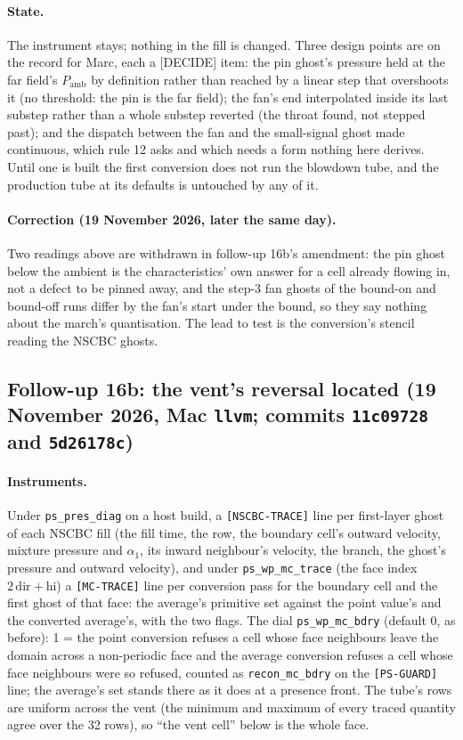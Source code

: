 \documentclass[11pt,a4paper]{article}
\newcommand{\code}[1]{\texttt{\small #1}}
\begin{document}
\paragraph{State.}  The instrument stays; nothing in the fill is
changed.  Three design points are on the record for Marc, each a
[DECIDE] item: the pin ghost's pressure held at the far field's
$P_{\mathrm{amb}}$ by definition rather than reached by a linear step
that overshoots it (no threshold: the pin is the far field); the fan's
end interpolated inside its last substep rather than a whole substep
reverted (the throat found, not stepped past); and the dispatch between
the fan and the small-signal ghost made continuous, which rule 12 asks
and which needs a form nothing here derives.  Until one is built the
first conversion does not run the blowdown tube, and the production
tube at its defaults is untouched by any of it.

\paragraph{Correction (19 November 2026, later the same day).}  Two
readings above are withdrawn in follow-up 16b's amendment: the pin
ghost below the ambient is the characteristics' own answer for a cell
already flowing in, not a defect to be pinned away, and the step-3 fan
ghosts of the bound-on and bound-off runs differ by the fan's start
under the bound, so they say nothing about the march's quantisation.
The lead to test is the conversion's stencil reading the NSCBC ghosts.


\subsection{Follow-up 16b: the vent's reversal located (19 November 2026, Mac \code{llvm}; commits \code{11c09728} and \code{5d26178c})}

\paragraph{Instruments.}  Under \code{ps\_pres\_diag} on a host build,
a \code{[NSCBC-TRACE]} line per first-layer ghost of each NSCBC fill
(the fill time, the row, the boundary cell's outward velocity, mixture
pressure and $\alpha_1$, its inward neighbour's velocity, the branch,
the ghost's pressure and outward velocity), and under
\code{ps\_wp\_mc\_trace} (the face index $2\,\mathrm{dir}+\mathrm{hi}$)
a \code{[MC-TRACE]} line per conversion pass for the boundary cell and
the first ghost of that face: the average's primitive set against the
point value's and the converted average's, with the two flags.  The
dial \code{ps\_wp\_mc\_bdry} (default 0, as before): 1 = the point
conversion refuses a cell whose face neighbours leave the domain across
a non-periodic face and the average conversion refuses a cell whose
face neighbours were so refused, counted as \code{recon\_mc\_bdry} on
the \code{[PS-GUARD]} line; the average's set stands there as it does
at a presence front.  The tube's rows are uniform across the vent (the
minimum and maximum of every traced quantity agree over the 32 rows),
so ``the vent cell'' below is the whole face.
\end{document}
